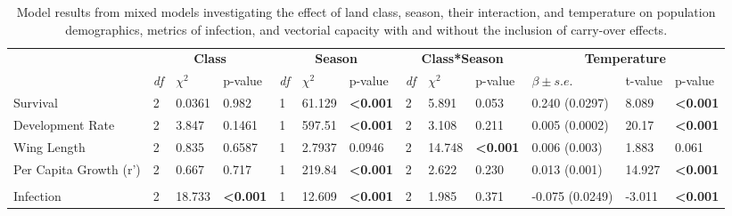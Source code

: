 \documentclass[12pt]{article}
\begin{document}
\begin{table}[]
\centering
\caption{Model results from mixed models investigating the effect of land class, season, their interaction, and temperature on population demographics, metrics of infection, and vectorial capacity with and without the inclusion of carry-over effects.}
\label{modelResults}
\begin{tabular}{lllllllllllll}
                                  & \multicolumn{3}{c}{\textbf{Class}}             & \multicolumn{3}{c}{\textbf{Season}}            & \multicolumn{3}{c}{\textbf{Class*Season}}      & \multicolumn{3}{c}{\textbf{Temperature}}             \\
                                  & \textit{df} & $\chi^2$  & p-value                 & \textit{df} & $\chi^2$  & p-value                 & \textit{df} & $\chi^2$  & p-value                 & $\beta \pm s.e.$          & t-value & p-value                 \\
Survival                    & 2           & 0.0361    & 0.982                   & 1           & 61.129    & \textbf{\textless0.001} & 2           & 5.891     & 0.053                   & 0.240 (0.0297)   & 8.089   & \textbf{\textless0.001} \\
Development Rate            & 2           & 3.847     & 0.1461                  & 1           & 597.51    & \textbf{\textless0.001} & 2           & 3.108     & 0.211                   & 0.005 (0.0002)   & 20.17   & \textbf{\textless0.001} \\
Wing Length                 & 2           & 0.835     & 0.6587                  & 1           & 2.7937    & 0.0946                  & 2           & 14.748    & \textbf{\textless0.001} & 0.006 (0.003)    & 1.883   & 0.061                   \\
Per Capita Growth (r')      & 2           & 0.667     & 0.717                   & 1           & 219.84    & \textbf{\textless0.001} & 2           & 2.622     & 0.230                   & 0.013 (0.001)    & 14.927  & \textbf{\textless0.001}  \\
                            &             &           &                         &             &           &                         &             &           &                         &                  &         &                         \\
Infection                   & 2           & 18.733    & \textbf{\textless0.001} & 1           & 12.609    & \textbf{\textless0.001} & 2           & 1.985     & 0.371                   & -0.075 (0.0249)  & -3.011  & \textbf{\textless0.001} \\

\end{tabular}
\end{table}
\end{document}
